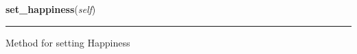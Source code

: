     \vspace{0.5ex}

\hspace{.8\funcindent}\begin{boxedminipage}{\funcwidth}

    \raggedright \textbf{set\_happiness}(\textit{self})

    \vspace{-1.5ex}

    \rule{\textwidth}{0.5\fboxrule}
\setlength{\parskip}{2ex}
    Method for setting Happiness

\setlength{\parskip}{1ex}
    \end{boxedminipage}

